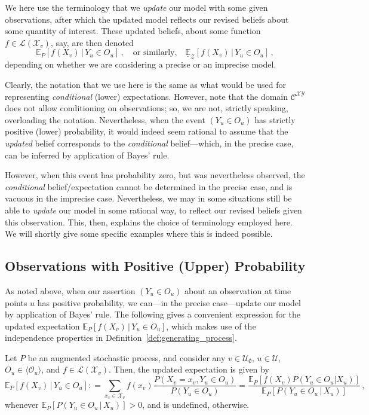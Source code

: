 \documentclass[twoside,11pt]{article}
\newcommand{\states}{\mathcal{X}}
\newcommand{\observs}{\mathcal{Y}}
\newcommand{\gambles}{\mathcal{L}}
\newcommand{\coloneqq}{:\!=}
\begin{document}
We here use the terminology that we \emph{update} our model with some given observations, after which the updated model reflects our revised beliefs about some quantity of interest. These updated beliefs, about some function $f\in\gambles(\states_v)$, say, are then denoted
\begin{equation*}
\mathbb{E}_P[f(X_v)\,\vert\,Y_u\in O_u]\,,\quad\text{or similarly,}\quad\underline{\mathbb{E}}_\mathcal{Z}[f(X_v)\,\vert\,Y_u\in O_u]\,,
\end{equation*}
depending on whether we are considering a precise or an imprecise model.

Clearly, the notation that we use here is the same as what would be used for representing \emph{conditional} (lower) expectations. However, note that the domain $\mathcal{C}^{\states\observs}$ does not allow conditioning on observations; so, we are not, strictly speaking, overloading the notation. Nevertheless, when the event $(Y_u\in O_u)$ has strictly positive (lower) probability, it would indeed seem rational to assume that the \emph{updated} belief corresponds to the \emph{conditional} belief---which, in the precise case, can be inferred by application of Bayes' rule. 

However, when this event has probability zero, but was nevertheless observed, the \emph{conditional} belief/expectation cannot be determined in the precise case, and is vacuous in the imprecise case. Nevertheless, we may in some situations still be able to \emph{update} our model in some rational way, to reflect our revised beliefs given this observation. This, then, explains the choice of terminology employed here. We will shortly give some specific examples where this is indeed possible.

\subsection{Observations with Positive (Upper) Probability}

As noted above, when our assertion $(Y_u\in O_u)$ about an observation at time points $u$ has positive probability, we can---in the precise case---update our model by application of Bayes' rule. The following gives a convenient expression for the updated expectation $\mathbb{E}_P[f(X_v)\,\vert\,Y_u\in O_u]$, which makes use of the independence properties in Definition~\ref{def:generating_process}.

\begin{proposition}\label{prop:precise_conditioning_for_positive}
Let $P$ be an augmented stochastic process, and consider any $v\in\mathcal{U}_\emptyset$, $u\in\mathcal{U}$, $O_u\in\langle\mathcal{O}_u\rangle$, and $f\in\gambles(\states_v)$. Then, the updated expectation is given by
\begin{equation*}
\mathbb{E}_P[f(X_v)\,\vert\,Y_u\in O_u] \coloneqq \sum_{x_v\in\states_v}f(x_v)\frac{P(X_v=x_v, Y_u\in O_u)}{P(Y_u\in O_u)} = \frac{\mathbb{E}_P[f(X_v)P(Y_u\in O_u\vert X_u)]}{\mathbb{E}_P[P(Y_u\in O_u\,\vert\,X_u)]}\,,
\end{equation*}
whenever $\mathbb{E}_P[P(Y_u\in O_u\,\vert\,X_u)]>0$, and is undefined, otherwise.
\end{proposition}
\end{document}
